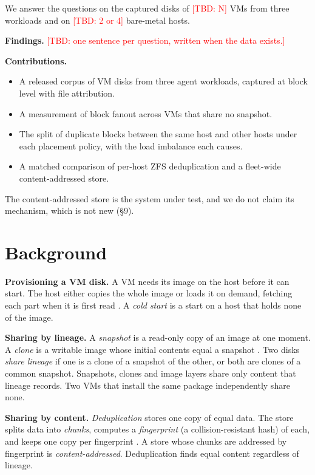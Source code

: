 \documentclass[10pt,twocolumn]{article}
\newcommand{\TBD}[1]{\textcolor{red}{[TBD: #1]}}
\begin{document}
We answer the questions on the captured disks of \TBD{N} VMs from three workloads and on \TBD{2 or 4} bare-metal hosts.

\textbf{Findings.} \TBD{one sentence per question, written when the data exists.}

\textbf{Contributions.}

\begin{itemize}
\item A released corpus of VM disks from three agent workloads, captured at block level with file attribution.

\item A measurement of block fanout across VMs that share no snapshot.

\item The split of duplicate blocks between the same host and other hosts under each placement policy, with the load imbalance each causes.

\item A matched comparison of per-host ZFS deduplication and a fleet-wide content-addressed store.

\end{itemize}

The content-addressed store is the system under test, and we do not claim its mechanism, which is not new (\S9).

\section{Background}

\textbf{Provisioning a VM disk.} A VM needs its image on the host before it can start. The host either copies the whole image or loads it on demand, fetching each part when it is first read \cite{slacker,lambda}. A \emph{cold start} is a start on a host that holds none of the image.

\textbf{Sharing by lineage.} A \emph{snapshot} is a read-only copy of an image at one moment. A \emph{clone} is a writable image whose initial contents equal a snapshot \cite{openzfs-concepts}. Two disks \emph{share lineage} if one is a clone of a snapshot of the other, or both are clones of a common snapshot. Snapshots, clones and image layers share only content that lineage records. Two VMs that install the same package independently share none.

\textbf{Sharing by content.} \emph{Deduplication} stores one copy of equal data. The store splits data into \emph{chunks}, computes a \emph{fingerprint} (a collision-resistant hash) of each, and keeps one copy per fingerprint \cite{venti,lbfs}. A store whose chunks are addressed by fingerprint is \emph{content-addressed}. Deduplication finds equal content regardless of lineage.
\end{document}
